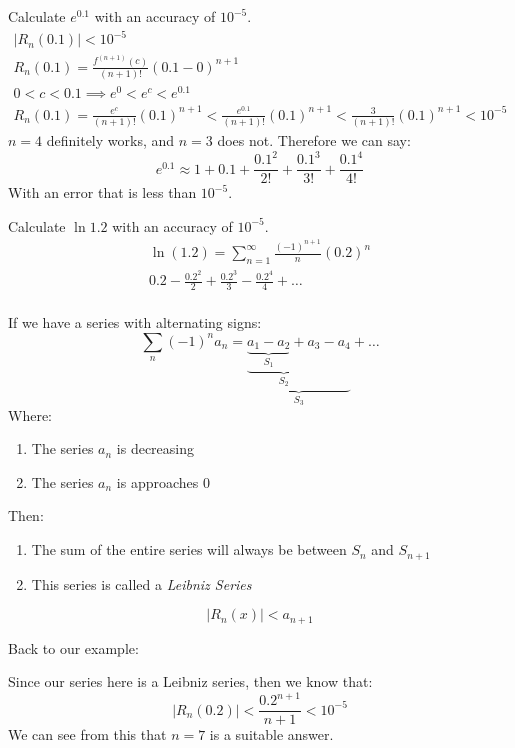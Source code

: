 \documentclass[00_complete]{subfiles}
\begin{document}
\begin{example}
    Calculate $e^{0.1}$ with an accuracy of $10^{-5}$.
    $$
    \begin{gathered}
        |R_n(0.1)| < 10^{-5} \\
        R_n(0.1)=\frac{f^{(n+1)}(c)}{(n+1)!}(0.1-0)^{n+1} \\
        0 < c < 0.1 \implies e^0 < e^c < e^{0.1} \\
        R_{n}(0.1)=\frac{e^c}{(n+1)!}(0.1)^{n+1} <
        \frac{e^{0.1}}{(n+1)!}(0.1)^{n+1} < \frac{3}{(n+1)!}(0.1)^{n+1} <
        10^{-5}
    \end{gathered}
    $$
    $n=4$ definitely works, and $n=3$ does not. Therefore we can say:
    $$e^{0.1} \approx 1 + 0.1 + \frac{0.1^2}{2!} + \frac{0.1^3}{3!} +
    \frac{0.1^4}{4!}$$
    With an error that is less than $10^{-5}$.
\end{example}
\begin{example}
    Calculate $\ln1.2$ with an accuracy of $10^{-5}$.
    $$
    \begin{gathered}
        \ln(1.2) = \sum_{n=1}^{\infty}\frac{(-1)^{n+1}}{n}(0.2)^n \\
        0.2-\frac{0.2^2}{2}+\frac{0.2^3}{3}-\frac{0.2^4}{4} + \dots \\
    \end{gathered}
    $$
    \begin{definition}
        If we have a series with alternating signs:
        $$\sum_n (-1)^n a_n =
        \underbrace{\underbrace{\underbrace{a_1-a_2}_{S_1}+a_3}_{S_2}-a_4}_{S_3}+ \dots$$
        Where:
        \begin{enumerate}
            \item The series $a_n$ is decreasing
            \item The series $a_n$ is approaches $0$
        \end{enumerate}
        Then:
       \begin{enumerate}
            \item The sum of the entire series will always be between $S_n$ and
                $S_{n+1}$
            \item This series is called a \emph{Leibniz Series}
        \end{enumerate}

            $$\boxed{|R_n(x)| < a_{n+1}}$$
    \end{definition}
    Back to our example:

    Since our series here is a Leibniz series, then we know that:
    $$|R_n(0.2)| < \frac{0.2^{n+1}}{n+1} < 10^{-5}$$
    We can see from this that $n=7$ is a suitable answer.
\end{example}
\end{document}
